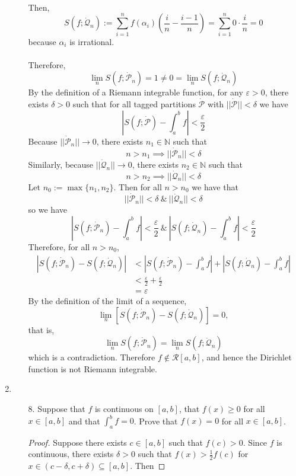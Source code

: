 \documentclass[12pt,letterpaper]{article}
\newcommand{\abs}[1]{\left\lvert #1 \right\rvert}
\newcommand{\N}{\mathbb{N}}
\newcommand{\dotp}{\dot{\mathcal{P}}}
\newcommand{\dotq}{\dot{\mathcal{Q}}}
\theoremstyle{case}
\theoremstyle{definition}
\begin{document}
\begin{enumerate}
\begin{enumerate}
			\\Then,
			\[S(f;\dotq_n):=\sum_{i=1}^{n}f(\alpha_i)\left(\frac{i}{n}-\frac{i-1}{n}\right)=\sum_{i=1}^{n}0 \cdot \frac{i}{n}=0\]
			because $\alpha_i$ is irrational.
			\\\\Therefore,
			\[\lim\limits_n S(f; \dotp_n)=1 \neq 0 = \lim\limits_n S(f;\dotq_n)\]
			By the definition of a Riemann integrable function, for any $\varepsilon>0$, there exists $\delta > 0$ such that for all tagged partitions $\dotp$ with $||\dotp||<\delta$ we have
			\[\abs{S(f;\dotp)-\int_{a}^{b}f}<\frac{\varepsilon}{2}\]
			Because $||\dotp_n||\to 0$, there exists $n_1 \in \N$ such that
			\[n>n_1 \implies ||\dotp_n||<\delta\]
			Similarly, because $||\dotq_n|| \to 0$, there exists $n_2 \in \N$ such that
			\[n>n_2 \implies ||\dotq_n||<\delta\]
			Let $n_0:=\max \{n_1,n_2\}$. Then for all $n > n_0$ we have that
			\[||\dotp_n||<\delta\ \&\ ||\dotq_n||<\delta\]
			so we have
			\[\abs{S(f;\dotp_n)-\int_{a}^{b}f}<\frac{\varepsilon}{2}\ \&\ \abs{S(f;\dotq_n)-\int_{a}^{b}f}<\frac{\varepsilon}{2}\]
			Therefore, for all $n > n_0$,
			\begin{align*}
				\abs{S(f;\dotp_n)-S(f;\dotq_n)}&<\abs{S(f;\dotp_n)-\int_{a}^{b}f}+\abs{S(f;\dotq_n)-\int_{a}^{b}f} \\
				&< \frac{\varepsilon}{2}+\frac{\varepsilon}{2} \\
				&= \varepsilon
			\end{align*}
			By the definition of the limit of a sequence,
			\[\lim\limits_n \left[S(f;\dotp_n)-S(f;\dotq_n)\right]=0,\]
			that is,
			\[\lim\limits_n S(f;\dotp_n)=\lim\limits_n S(f;\dotq_n)\]
			which is a contradiction. Therefore $f \notin \mathcal{R}[a,b]$, and hence the Dirichlet function is not Riemann integrable.
		\end{enumerate}
	\item 
		\begin{enumerate}
			\item[8.] Suppose that $f$ is continuous on $[a,b]$, that $f(x) \geq 0$ for all $x \in [a,b]$ and that $\int_{a}^{b}f=0$. Prove that $f(x)=0$ for all $x \in [a,b]$.
			\begin{proof}
				Suppose there exists $c \in [a,b]$ such that $f(c)>0$. Since $f$ is continuous, there exists $\delta >0$ such that $f(x)>\frac{1}{2}f(c)$ for $x \in (c-\delta, c+ \delta) \subseteq [a,b]$. Then

\end{proof}
\end{enumerate}
\end{enumerate}
\end{document}
